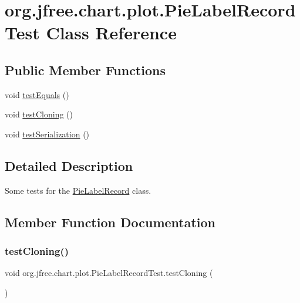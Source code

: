 \hypertarget{classorg_1_1jfree_1_1chart_1_1plot_1_1_pie_label_record_test}{}\section{org.\+jfree.\+chart.\+plot.\+Pie\+Label\+Record\+Test Class Reference}
\label{classorg_1_1jfree_1_1chart_1_1plot_1_1_pie_label_record_test}
\subsection*{Public Member Functions}
\begin{DoxyCompactItemize}
\item 
void \mbox{\hyperlink{classorg_1_1jfree_1_1chart_1_1plot_1_1_pie_label_record_test_a5387be1531878686e042188ac766afbe}{test\+Equals}} ()
\item 
void \mbox{\hyperlink{classorg_1_1jfree_1_1chart_1_1plot_1_1_pie_label_record_test_ae68f95ef01bb8e51c41fd03437cef7c4}{test\+Cloning}} ()
\item 
void \mbox{\hyperlink{classorg_1_1jfree_1_1chart_1_1plot_1_1_pie_label_record_test_a92fe7eefa7d3945584fa4c34ac527bc2}{test\+Serialization}} ()
\end{DoxyCompactItemize}


\subsection{Detailed Description}
Some tests for the \mbox{\hyperlink{classorg_1_1jfree_1_1chart_1_1plot_1_1_pie_label_record}{Pie\+Label\+Record}} class. 

\subsection{Member Function Documentation}
\mbox{\label{classorg_1_1jfree_1_1chart_1_1plot_1_1_pie_label_record_test_ae68f95ef01bb8e51c41fd03437cef7c4}} 
\subsubsection{\texorpdfstring{test\+Cloning()}{testCloning()}}
{\footnotesize\ttfamily void org.\+jfree.\+chart.\+plot.\+Pie\+Label\+Record\+Test.\+test\+Cloning (\begin{DoxyParamCaption}{ }\end{DoxyParamCaption})}


